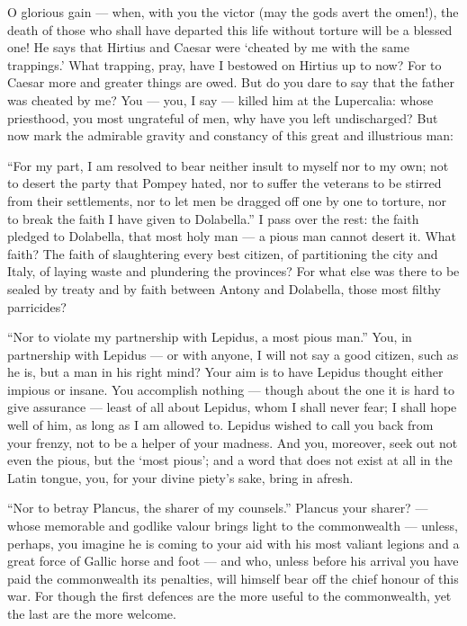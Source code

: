  O glorious gain --- when, with you the victor (may the gods avert the omen!), the death of those who shall have departed this life without torture will be a blessed one! He says that Hirtius and Caesar were `cheated by me with the same trappings.' What trapping, pray, have I bestowed on Hirtius up to now? For to Caesar more and greater things are owed. But do you dare to say that the father was cheated by me? You --- you, I say --- killed him at the Lupercalia: whose priesthood, you most ungrateful of men, why have you left undischarged? But now mark the admirable gravity and constancy of this great and illustrious man:

 ``For my part, I am resolved to bear neither insult to myself nor to my own; not to desert the party that Pompey hated, nor to suffer the veterans to be stirred from their settlements, nor to let men be dragged off one by one to torture, nor to break the faith I have given to Dolabella.'' I pass over the rest: the faith pledged to Dolabella, that most holy man --- a pious man cannot desert it. What faith? The faith of slaughtering every best citizen, of partitioning the city and Italy, of laying waste and plundering the provinces? For what else was there to be sealed by treaty and by faith between Antony and Dolabella, those most filthy parricides?

 ``Nor to violate my partnership with Lepidus, a most pious man.'' You, in partnership with Lepidus --- or with anyone, I will not say a good citizen, such as he is, but a man in his right mind? Your aim is to have Lepidus thought either impious or insane. You accomplish nothing --- though about the one it is hard to give assurance --- least of all about Lepidus, whom I shall never fear; I shall hope well of him, as long as I am allowed to. Lepidus wished to call you back from your frenzy, not to be a helper of your madness. And you, moreover, seek out not even the pious, but the `most pious'; and a word that does not exist at all in the Latin tongue, you, for your divine piety's sake, bring in afresh.

 ``Nor to betray Plancus, the sharer of my counsels.'' Plancus your sharer? --- whose memorable and godlike valour brings light to the commonwealth --- unless, perhaps, you imagine he is coming to your aid with his most valiant legions and a great force of Gallic horse and foot --- and who, unless before his arrival you have paid the commonwealth its penalties, will himself bear off the chief honour of this war. For though the first defences are the more useful to the commonwealth, yet the last are the more welcome.

